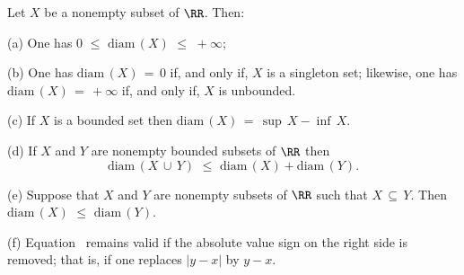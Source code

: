 {\V

        Let $X$ be a nonempty subset of ${\RR}$. Then:

\V

        (a) One has $0\,\,{\leq}\,\,\mbox{diam}\,(X)\,\,{\leq}\,\,+{\infty}$;

\V

        (b) One has $\mbox{diam}\,(X) \,=\, 0$ if, and only if, $X$ is a singleton set;
    likewise, one has $\mbox{diam}\,(X) \,=\, +{\infty}$ if, and only if, $X$ is unbounded.

\V

        (c) If $X$ is a bounded set then $\mbox{diam}\,(X) \,=\, {\sup}\,X - {\inf}\,X$.

\V

        (d) If $X$ and $Y$ are nonempty bounded subsets of ${\RR}$ then
        \begin{displaymath}
        \mbox{diam}\,(X\,{\cup}\,Y)\,\,{\leq}\,\,\mbox{diam}\,(X) + \mbox{diam}\,(Y).
        \end{displaymath}

\V

        (e) Suppose that $X$ and $Y$ are nonempty subsets of ${\RR}$ such that $X \,{\subseteq}\, Y$.
    Then $\mbox{diam}\,(X)\,\,{\leq}\,\,\mbox{diam}\,(Y)$.

\V

        (f) Equation~ remains valid if the absolute value sign on the right side is removed;
    that is, if one replaces $|y-x|$ by $y-x$.

\V
\V
}%

